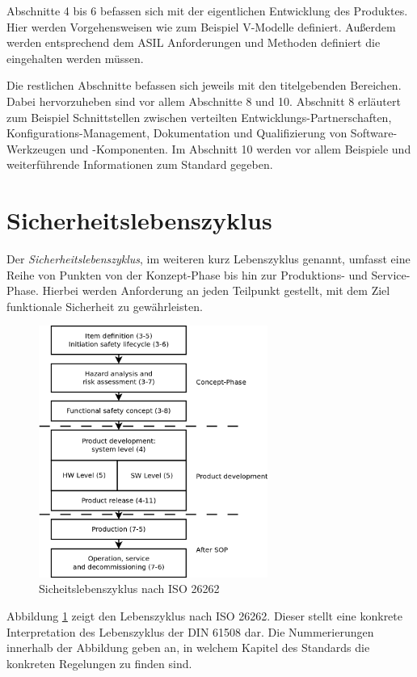 \documentclass[a4paper,DIV=calc,ngerman]{scrartcl}
\begin{document}
Abschnitte 4 bis 6 befassen sich mit der eigentlichen Entwicklung des Produktes. Hier werden Vorgehensweisen wie zum Beispiel V-Modelle definiert. Außerdem werden entsprechend dem ASIL Anforderungen und Methoden definiert die eingehalten werden müssen.

Die restlichen Abschnitte befassen sich jeweils mit den titelgebenden Bereichen. Dabei hervorzuheben sind vor allem Abschnitte 8 und 10. Abschnitt 8 erläutert zum Beispiel Schnittstellen zwischen verteilten Entwicklungs-Partnerschaften, Konfigurations-Management, Dokumentation und Qualifizierung von Software-Werkzeugen und -Komponenten. Im Abschnitt 10 werden vor allem Beispiele und weiterführende Informationen zum Standard gegeben.


\section{Sicherheitslebenszyklus}
\label{sec:Sicherheitslebenszyklus}
Der \emph{Sicherheitslebenszyklus}, im weiteren kurz Lebenszyklus genannt, umfasst eine Reihe von Punkten von der Konzept-Phase bis hin zur Produktions- und Service-Phase. Hierbei werden Anforderung an jeden Teilpunkt gestellt, mit dem Ziel funktionale Sicherheit zu gewährleisten.

\begin{figure}
\includegraphics[width=7.5cm]{Abb_6_1}
\caption{Sicheitslebenszyklus nach ISO 26262\cite{1}}
\label{fig:lifecycle}
\end{figure}

Abbildung \ref{fig:lifecycle} zeigt den Lebenszyklus nach ISO 26262. Dieser stellt eine konkrete Interpretation des Lebenszyklus der DIN 61508 dar. Die Nummerierungen innerhalb der Abbildung geben an, in welchem Kapitel des Standards die konkreten Regelungen zu finden sind. 
\end{document}
